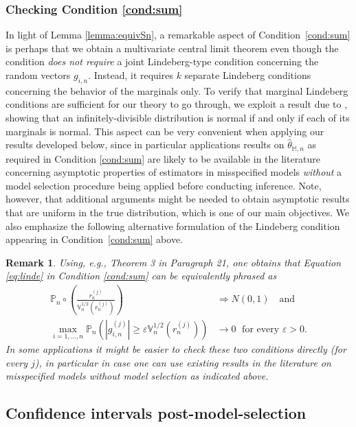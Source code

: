 \documentclass[preprint]{imsart}
\newcommand{\eps}{\varepsilon}
\newcommand{\M}{\mathbb M}
\newtheorem{remark}[theorem]{Remark}
\numberwithin{equation}{section}
\begin{document}
\subsubsection{Checking Condition \ref{cond:sum}}\label{sec:checking}
In light of Lemma \ref{lemma:equivSn}, a remarkable aspect of Condition~\ref{cond:sum} is perhaps that we obtain a multivariate central limit theorem even though the condition \textit{does not require} a joint Lindeberg-type condition concerning the random vectors $g_{i,n}$. Instead, it requires $k$ separate Lindeberg conditions concerning the behavior of the marginals only. To verify that marginal Lindeberg conditions are sufficient for our theory to go through, we exploit a result due to \cite{pollak1972}, showing that an infinitely-divisible distribution is normal if and only if each of its marginals is normal. This aspect can be very convenient when applying our results developed below, since in particular applications results on $\hat{\theta}_{\M,n}$ as required in Condition \ref{cond:sum} are likely to be available in the literature concerning asymptotic properties of estimators in misspecified models \textit{without} a model selection procedure being applied before conducting inference. Note, however, that additional arguments might be needed to obtain asymptotic results that are uniform in the true distribution, which is one of our main objectives. We also emphasize the following alternative formulation of the Lindeberg condition appearing in Condition~\ref{cond:sum} above.
 
\begin{remark}\label{rem:lindeequiv}
Using, e.g., \cite{gnedenko} Theorem 3 in Paragraph 21, one obtains that Equation \eqref{eq:linde} in Condition \ref{cond:sum} can be \emph{equivalently} phrased as
%
\begin{align*}
\mathbb{P}_n\circ \left( \frac{r_n^{(j)}}{\mathbb{V}^{1/2}_n(r_n^{(j)})} \right) &\Rightarrow N(0, 1) \quad\text{and}\\[7pt]
\max_{i = 1, \hdots, n} \mathbb{P}_n \left(|g_{i,n}^{(j)} | \geq \eps\mathbb{V}^{1/2}_n(r_n^{(j)}) \right) &\to 0\; \text{ for every } \eps > 0.
\end{align*}
%
In some applications it might be easier to check these two conditions directly (for every $j$), in particular in case one can use existing results in the literature on misspecified models without model selection as indicated above.
\end{remark}

\subsection{Confidence intervals post-model-selection}
\label{sec:CIPOSI}
\end{document}
